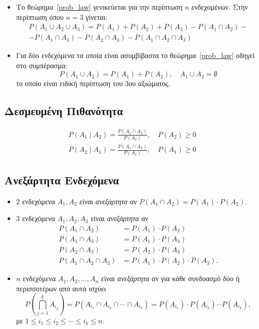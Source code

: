 \begin{remarks}  \mbox{}
\begin{itemize}
  \item Το θεώρημα~\ref{prob_law} γενικεύεται για την περίπτωση $n$ ενδεχομένων. Στην περίπτωση όπου $n=3$ γίνεται:
\begin{multline*}
P(A_{1} \cup A_{2} \cup A_{3}) = P(A_{1}) + P(A_{2}) + P(A_{3}) -   P(A_{1} \cap A_{2}) - \\ -  P(A_{1} \cap A_{3}) -  P(A_{2} \cap A_{3}) -  P(A_{1} \cap A_{2} \cap A_{3})
\end{multline*}

 \item Για δύο ενδεχόμενα τα οποία είναι ασυμβίβαστα το θεώρημα~\ref{prob_law} οδηγεί στο συμπέρασμα:
 \[
P(A_{1} \cup A_{2}) = P(A_{1}) + P(A_{2}), \quad A_{1} \cup A_{2} = \emptyset
 \]
το οποίο είναι ειδική περίπτωση του $3$ου αξιώματος.
\end{itemize}
\end{remarks}

\subsection*{Δεσμευμένη Πιθανότητα}

  \begin{gather*}
    P(A_{1} \mid A_{2}) = \frac{P(A_{1} \cap A_{2})}{P(A_{2})}, \quad P(A_{2}) \geq 0 \\
    P(A_{2} \mid A_{1}) = \frac{P(A_{1} \cap A_{2})}{P(A_{1})}, \quad P(A_{1}) \geq 0
  \end{gather*}

\subsection*{Ανεξάρτητα Ενδεχόμενα}

\begin{itemize}
  \item $2$ ενδεχόμενα $A_{1}, A_{2}$ είναι \textit{ανεξάρτητα} αν $P(A_{1} \cap A_{2}) =  P(A_{1}) \cdot P(A_{2})$.
  \item $3$ ενδεχόμενα $A_{1}, A_{2}, A_{3}$ είναι \textit{ανεξάρτητα} αν
  \begin{align*}
    P(A_{1} \cap A_{2}) &=  P(A_{1}) \cdot P(A_{2}) \\
    P(A_{1} \cap A_{3}) &=  P(A_{1}) \cdot P(A_{3}) \\
    P(A_{2} \cap A_{3}) &=  P(A_{2}) \cdot P(A_{3}) \\
    P(A_{1} \cap A_{2} \cap A_{3}) &=  P(A_{1}) \cdot P(A_{2}) \cdot P(A_{3}).
  \end{align*}
  \item $n$ ενδεχόμενα $A_{1}, A_{2}, \ldots, A_{n}$ είναι \textit{ανεξάρτητα} αν για κάθε συνδυασμό δύο ή περισσοτέρων από αυτά ισχύει
\[
P\left(\bigcap\limits_{j=1}^{k}A_{i_{j}}\right)=P(A_{i_{1}} \cap A_{i_{2}} \cap \cdots \cap A_{i_{k}}) = P(A_{i_{1}}) \cdot P(A_{i_{2}}) \cdots P(A_{i_{k}}),
\]
με $1 \leq i_{1} \leq i_{2} \leq \cdots \leq i_{k} \leq n$.
\end{itemize}

